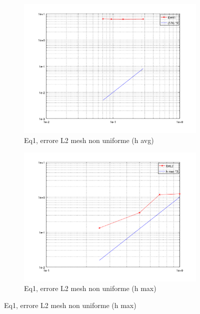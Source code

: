 \documentclass[12pt,a4paper]{report}
\theoremstyle{theorem}
\theoremstyle{theorem}
\theoremstyle{definition}
\begin{document}
\begin{figure}[!h]
	\centering
	\begin{subfigure}[b]{0.49\textwidth}
    		\includegraphics[width=\textwidth]{Eq1-L2avg.png}
    		\caption{Eq1, errore L2 mesh non uniforme (h avg)}
    	\end{subfigure}
    	\begin{subfigure}[b]{0.49\textwidth}
    		\includegraphics[width=\textwidth]{Eq1-L2max.png}
    		\caption{Eq1, errore L2 mesh non uniforme (h max)}
    	\end{subfigure}
\end{figure}
\end{document}

